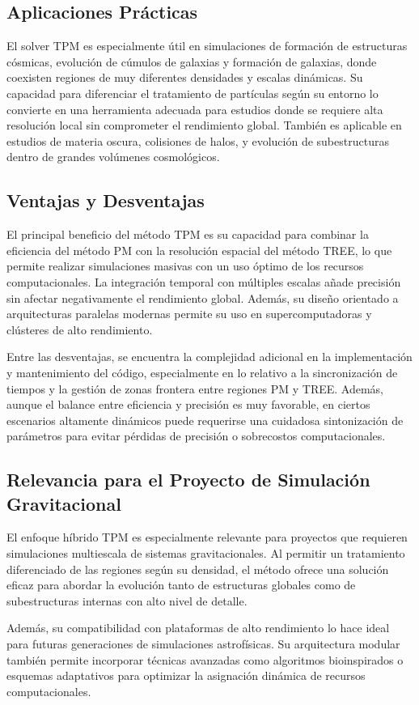 \subsection{Aplicaciones Prácticas}

El solver TPM es especialmente útil en simulaciones de formación de estructuras cósmicas, evolución de cúmulos de galaxias y formación de galaxias, donde coexisten regiones de muy diferentes densidades y escalas dinámicas. Su capacidad para diferenciar el tratamiento de partículas según su entorno lo convierte en una herramienta adecuada para estudios donde se requiere alta resolución local sin comprometer el rendimiento global. También es aplicable en estudios de materia oscura, colisiones de halos, y evolución de subestructuras dentro de grandes volúmenes cosmológicos.

\subsection{Ventajas y Desventajas}

El principal beneficio del método TPM es su capacidad para combinar la eficiencia del método PM con la resolución espacial del método TREE, lo que permite realizar simulaciones masivas con un uso óptimo de los recursos computacionales. La integración temporal con múltiples escalas añade precisión sin afectar negativamente el rendimiento global. Además, su diseño orientado a arquitecturas paralelas modernas permite su uso en supercomputadoras y clústeres de alto rendimiento.

Entre las desventajas, se encuentra la complejidad adicional en la implementación y mantenimiento del código, especialmente en lo relativo a la sincronización de tiempos y la gestión de zonas frontera entre regiones PM y TREE. Además, aunque el balance entre eficiencia y precisión es muy favorable, en ciertos escenarios altamente dinámicos puede requerirse una cuidadosa sintonización de parámetros para evitar pérdidas de precisión o sobrecostos computacionales.

\subsection{Relevancia para el Proyecto de Simulación Gravitacional}

El enfoque híbrido TPM es especialmente relevante para proyectos que requieren simulaciones multiescala de sistemas gravitacionales. Al permitir un tratamiento diferenciado de las regiones según su densidad, el método ofrece una solución eficaz para abordar la evolución tanto de estructuras globales como de subestructuras internas con alto nivel de detalle.

Además, su compatibilidad con plataformas de alto rendimiento lo hace ideal para futuras generaciones de simulaciones astrofísicas. Su arquitectura modular también permite incorporar técnicas avanzadas como algoritmos bioinspirados o esquemas adaptativos para optimizar la asignación dinámica de recursos computacionales.


